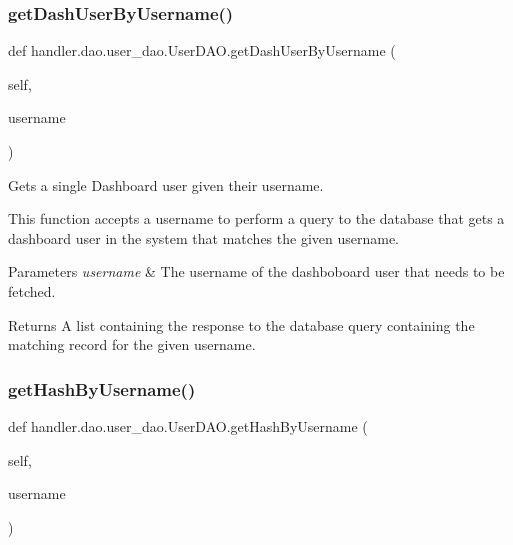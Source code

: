 \subsubsection{\texorpdfstring{get\+Dash\+User\+By\+Username()}{getDashUserByUsername()}}
{\footnotesize\ttfamily def handler.\+dao.\+user\+\_\+dao.\+User\+D\+A\+O.\+get\+Dash\+User\+By\+Username (\begin{DoxyParamCaption}\item[{}]{self,  }\item[{}]{username }\end{DoxyParamCaption})}



Gets a single Dashboard user given their username. 

This function accepts a username to perform a query to the database that gets a dashboard user in the system that matches the given username.


\begin{DoxyParams}{Parameters}
{\em username} & The username of the dashboboard user that needs to be fetched.\\
\hline
\end{DoxyParams}
\begin{DoxyReturn}{Returns}
A list containing the response to the database query containing the matching record for the given username. 
\end{DoxyReturn}
\mbox{\label{classhandler_1_1dao_1_1user__dao_1_1_user_d_a_o_aa2275f3d06d7b6e83597600c1e6eccbd}} 
\subsubsection{\texorpdfstring{get\+Hash\+By\+Username()}{getHashByUsername()}}
{\footnotesize\ttfamily def handler.\+dao.\+user\+\_\+dao.\+User\+D\+A\+O.\+get\+Hash\+By\+Username (\begin{DoxyParamCaption}\item[{}]{self,  }\item[{}]{username }\end{DoxyParamCaption})}



